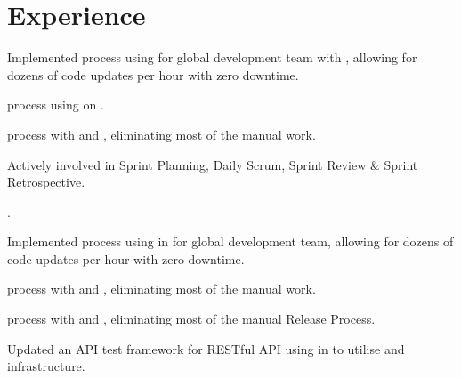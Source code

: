 \documentclass[]{resume}
\begin{document}
\begin{minipage}[t]{0.66\textwidth} 


\section{Experience}
\begin{tightemize}
\item Implemented  process using  for global development team with , allowing for dozens of code updates per hour with zero downtime.
\item {} process using  on .
\item {} process with  and , eliminating most of the manual work.
\item Actively involved in Sprint Planning, Daily Scrum, Sprint Review \& Sprint Retrospective.
\item {}.
\end{tightemize}
\sectionsep
{}
\begin{tightemize}
\item Implemented  process using  in  for global development team, allowing for dozens of code updates per hour with zero downtime.
\item {} process with  and , eliminating most of the manual work.
\item {} process with  and , eliminating most of the manual Release Process.
\item Updated an API test framework for RESTful API using  in  to utilise  and  infrastructure.

\end{tightemize}
\end{minipage}
\end{document}
